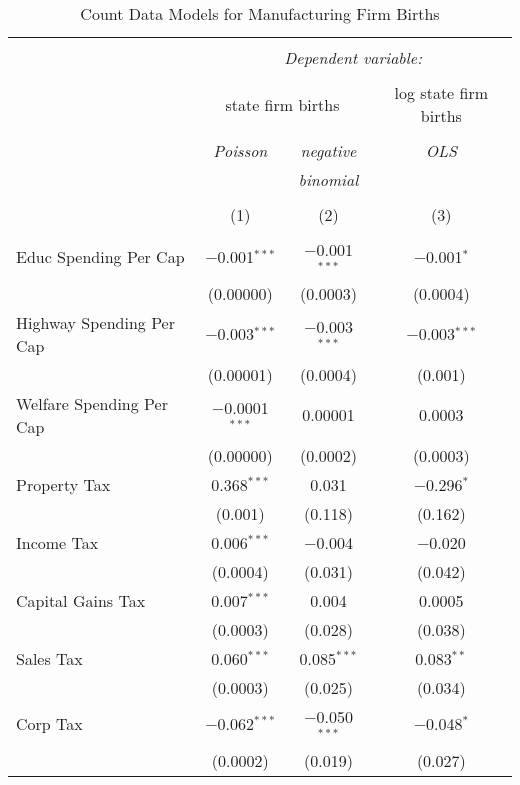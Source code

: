
\begin{table}[!htbp] \centering 
  \caption{Count Data Models for Manufacturing Firm Births} 
  \label{} 
\begin{tabular}{@{\extracolsep{5pt}}lccc} 
\\[-1.8ex]\hline 
\hline \\[-1.8ex] 
 & \multicolumn{3}{c}{\textit{Dependent variable:}} \\ 
\cline{2-4} 
\\[-1.8ex] & \multicolumn{2}{c}{state firm births} & log state firm births \\ 
\\[-1.8ex] & \textit{Poisson} & \textit{negative} & \textit{OLS} \\ 
 & \textit{} & \textit{binomial} & \textit{} \\ 
\\[-1.8ex] & (1) & (2) & (3)\\ 
\hline \\[-1.8ex] 
 Educ Spending Per Cap & $-$0.001$^{***}$ & $-$0.001$^{***}$ & $-$0.001$^{*}$ \\ 
  & (0.00000) & (0.0003) & (0.0004) \\ 
  Highway Spending Per Cap  & $-$0.003$^{***}$ & $-$0.003$^{***}$ & $-$0.003$^{***}$ \\ 
  & (0.00001) & (0.0004) & (0.001) \\ 
  Welfare Spending Per Cap  & $-$0.0001$^{***}$ & 0.00001 & 0.0003 \\ 
  & (0.00000) & (0.0002) & (0.0003) \\ 
  Property Tax & 0.368$^{***}$ & 0.031 & $-$0.296$^{*}$ \\ 
  & (0.001) & (0.118) & (0.162) \\ 
  Income Tax & 0.006$^{***}$ & $-$0.004 & $-$0.020 \\ 
  & (0.0004) & (0.031) & (0.042) \\ 
  Capital Gains Tax & 0.007$^{***}$ & 0.004 & 0.0005 \\ 
  & (0.0003) & (0.028) & (0.038) \\ 
  Sales Tax & 0.060$^{***}$ & 0.085$^{***}$ & 0.083$^{**}$ \\ 
  & (0.0003) & (0.025) & (0.034) \\ 
  Corp Tax & $-$0.062$^{***}$ & $-$0.050$^{***}$ & $-$0.048$^{*}$ \\ 
  & (0.0002) & (0.019) & (0.027) \\ 

\end{tabular}
\end{table}
